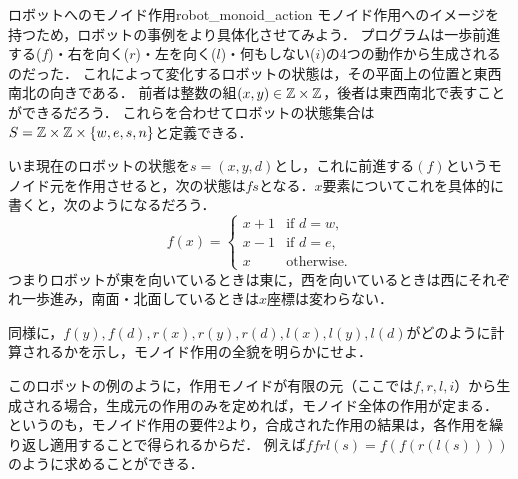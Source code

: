 \documentclass[11pt,a4paper, dvipdfmx]{jsarticle}
\begin{document}
\begin{rei}{ロボットへのモノイド作用}{robot_monoid_action}
    モノイド作用へのイメージを持つため，ロボットの事例をより具体化させてみよう．
    プログラムは一歩前進する($f$)・右を向く($r$)・左を向く($l$)・何もしない($i$)の4つの動作から生成されるのだった．
    これによって変化するロボットの状態は，その平面上の位置と東西南北の向きである．
    前者は整数の組$(x, y) \in \mathbb{Z} \times \mathbb{Z}$，後者は東西南北で表すことができるだろう．
    これらを合わせてロボットの状態集合は$S = \mathbb{Z} \times \mathbb{Z} \times \{w, e, s, n\}$と定義できる．
    
    いま現在のロボットの状態を$s = (x, y, d)$とし，これに前進する$(f)$というモノイド元を作用させると，次の状態は$fs$となる．$x$要素についてこれを具体的に書くと，次のようになるだろう．
    \[
    f(x) = \begin{cases}
        x + 1 & \text{if } d=w, \\
        x - 1 & \text{if } d=e, \\
        x & \text{otherwise}.
    \end{cases}
    \]
    つまりロボットが東を向いているときは東に，西を向いているときは西にそれぞれ一歩進み，南面・北面しているときは$x$座標は変わらない．
\end{rei}

\begin{renshu}{}{}
    同様に，$f(y), f(d), r(x), r(y), r(d), l(x), l(y), l(d)$がどのように計算されるかを示し，モノイド作用の全貌を明らかにせよ．
\end{renshu}

このロボットの例のように，作用モノイドが有限の元（ここでは$f, r, l, i$）から生成される場合，生成元の作用のみを定めれば，モノイド全体の作用が定まる．
というのも，モノイド作用の要件2より，合成された作用の結果は，各作用を繰り返し適用することで得られるからだ．
例えば$ffrl(s) = f(f(r(l(s))))$のように求めることができる．
\end{document}
